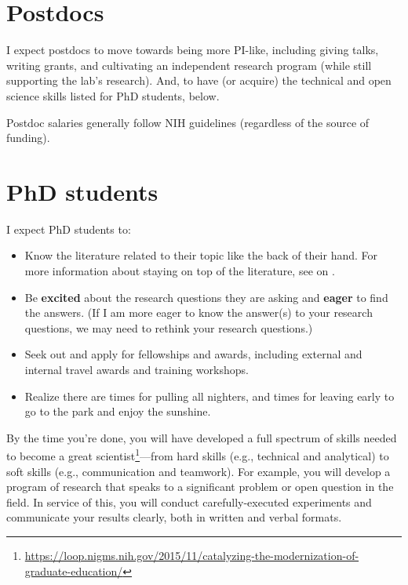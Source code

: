 \documentclass[letterpaper,12pt,oneside]{memoir}
\begin{document}
\section{Postdocs}

I expect postdocs to move towards being more PI-like, including giving talks, writing grants, and cultivating an independent research program (while still supporting the lab's research). And, to have (or acquire) the technical and open science skills listed for PhD students, below.


Postdoc salaries generally follow NIH guidelines (regardless of the source of funding).

\section{PhD students}

I expect PhD students to:

\begin{itemize}
\item Know the literature related to their topic like the back of their hand. For more information about staying on top of the literature, see  on .
\item Be \textbf{excited} about the research questions they are asking and \textbf{eager} to find the answers. (If I am more eager to know the answer(s) to your research questions, we may need to rethink your research questions.)
\item Seek out and apply for fellowships and awards, including external and internal travel awards and training workshops.
\item Realize there are times for pulling all nighters, and times for leaving early to go to the park and enjoy the sunshine.
\end{itemize}

By the time you're done, you will have developed a full spectrum of skills needed to become a great scientist\footnote{\url{https://loop.nigms.nih.gov/2015/11/catalyzing-the-modernization-of-graduate-education/}}---from hard skills (e.g., technical and analytical) to soft skills (e.g., communication and teamwork). For example, you will develop a program of research that speaks to a significant problem or open question in the field. In service of this, you will conduct carefully-executed experiments and communicate your results clearly, both in written and verbal formats. 
\end{document}
